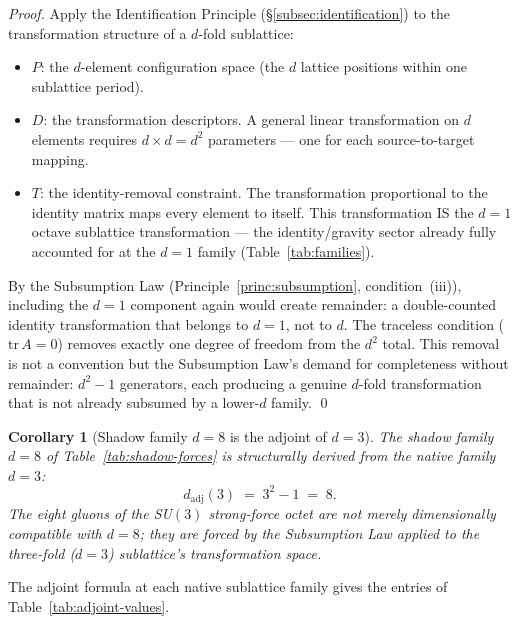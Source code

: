 \documentclass[11pt,a4paper]{article}
\newtheorem{corollary}[theorem]{Corollary}
\theoremstyle{definition}
\theoremstyle{remark}
\begin{document}
\begin{proof}
Apply the Identification Principle (\S\ref{subsec:identification}) to the transformation structure of a $d$-fold sublattice:
\begin{itemize}[leftmargin=*]
\item $P$: the $d$-element configuration space (the $d$ lattice positions within one sublattice period).
\item $D$: the transformation descriptors. A general linear transformation on $d$ elements requires $d \times d = d^{2}$ parameters --- one for each source-to-target mapping.
\item $T$: the identity-removal constraint. The transformation proportional to the identity matrix maps every element to itself. This transformation IS the $d=1$ octave sublattice transformation --- the identity/gravity sector already fully accounted for at the $d=1$ family (Table~\ref{tab:families}).
\end{itemize}
By the Subsumption Law (Principle~\ref{princ:subsumption}, condition~(iii)), including the $d=1$ component again would create remainder: a double-counted identity transformation that belongs to $d=1$, not to $d$. The traceless condition ($\mathrm{tr}\,A = 0$) removes exactly one degree of freedom from the $d^{2}$ total. This removal is not a convention but the Subsumption Law's demand for completeness without remainder: $d^{2} - 1$ generators, each producing a genuine $d$-fold transformation that is not already subsumed by a lower-$d$ family. \qed
\end{proof}

\begin{corollary}[Shadow family $d=8$ is the adjoint of $d=3$]\label{cor:d8-su3}
The shadow family $d=8$ of Table~\ref{tab:shadow-forces} is structurally derived from the native family $d=3$:
\[
d_{\mathrm{adj}}(3) \;=\; 3^{2} - 1 \;=\; 8.
\]
The eight gluons of the SU$(3)$ strong-force octet are not merely dimensionally compatible with $d=8$; they are \emph{forced} by the Subsumption Law applied to the three-fold ($d=3$) sublattice's transformation space.
\end{corollary}

The adjoint formula at each native sublattice family gives the entries of Table~\ref{tab:adjoint-values}.
\end{document}

